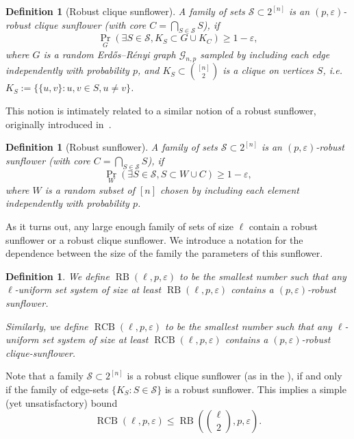 \documentclass[10pt,a4paper]{article}
\newcommand{\RCB}{\mathop{RCB}}
\newcommand{\RB}{\mathop{RB}}
\newcommand{\ErdosRenyi}{Erdős–Rényi }
\newtheorem{definition}[theorem]{Definition}
\begin{document}
\begin{definition}[Robust clique sunflower]
\label{def:robust-clique-sunflower}
A family of sets $\mathcal{S} \subset 2^{[n]}$ is an $(p, \varepsilon)$-robust clique sunflower (with core $C = \bigcap_{S \in \mathcal{S}} S$), if 
\begin{equation*}
    \Pr_G(\exists S \in \mathcal{S}, K_S \subset G \cup K_C) \geq 1-\varepsilon,
\end{equation*} 
where $G$ is a random \ErdosRenyi graph $\mathcal{G}_{n,p}$ sampled by including each edge independently with probability $p$, and $K_S \subset \binom{[n]}{2}$ is a clique on vertices $S$, i.e. $K_S := \{ \{u, v\} : u, v \in S, u\not=v\}$.
\end{definition}
This notion is intimately related to a similar notion of a robust sunflower, originally introduced in~\cite{rossman2010monotone}.
\begin{definition}[Robust sunflower]
\label{def:robust-sunflower}
A family of sets $\mathcal{S} \subset 2^{[n]}$ is an $(p, \varepsilon)$-robust sunflower (with core $C = \bigcap_{S \in \mathcal{S}} S$), if 
\begin{equation*}
    \Pr_W(\exists S \in \mathcal{S}, S \subset W \cup C) \geq 1-\varepsilon,
\end{equation*} 
where $W$ is a random subset of $[n]$ chosen by including each element independently with probability $p$.
\end{definition}
As it turns out, any large enough family of sets of size $\ell$ contain a robust sunflower or a robust clique sunflower. We introduce a notation for the dependence between the size of the family the parameters of this sunflower.
\begin{definition}
\label{def:robust-sunflower-function}
    We define $\RB(\ell, p, \varepsilon)$ to be the smallest number such that any $\ell$-uniform set system of size at least $\RB(\ell, p, \varepsilon)$ contains a $(p, \varepsilon)$-robust sunflower.

    Similarly, we define $\RCB(\ell, p, \varepsilon)$ to be the smallest number such that any $\ell$-uniform set system of size at least $\RCB(\ell, p, \varepsilon)$ contains a $(p, \varepsilon)$-robust clique-sunflower.
\end{definition}

Note that a family $\mathcal{S} \subset 2^{[n]}$ is a robust clique sunflower (as in the ), if and only if the family of edge-sets $\{ K_S : S \in \mathcal{S}\}$ is a robust sunflower.
This implies a simple (yet unsatisfactory) bound
\begin{equation}
\label{eq:simple-rcb-rb-comparison}
\RCB(\ell, p, \varepsilon) \leq \RB\left(\binom{\ell}{2}, p, \varepsilon\right).
\end{equation}
\end{document}
